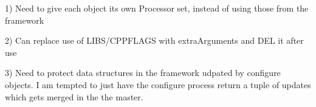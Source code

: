 1) Need to give each object its own Processor set, instead of using those from the framework

2) Can replace use of LIBS/CPPFLAGS with extraArguments and DEL it after use

3) Need to protect data structures in the framework udpated by configure objects. I am tempted to
   just have the configure process return a tuple of updates which gets merged in the the master.
